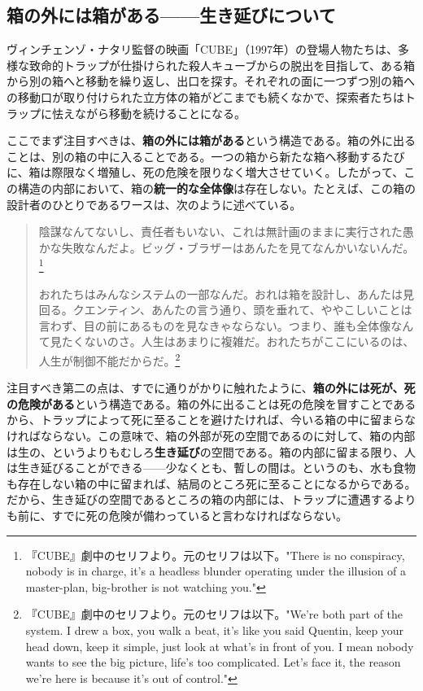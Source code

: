 \documentclass[a4paper]{jsarticle}
\begin{document}
\subsection{箱の外には箱がある------生き延びについて}

ヴィンチェンゾ・ナタリ監督の映画「CUBE」（1997年）の登場人物たちは、多様な致命的トラップが仕掛けられた殺人キューブからの脱出を目指して、ある箱から別の箱へと移動を繰り返し、出口を探す。それぞれの面に一つずつ別の箱への移動口が取り付けられた立方体の箱がどこまでも続くなかで、探索者たちはトラップに怯えながら移動を続けることになる。

ここでまず注目すべきは、\textbf{箱の外には箱がある}という構造である。箱の外に出ることは、別の箱の中に入ることである。一つの箱から新たな箱へ移動するたびに、箱は際限なく増殖し、死の危険を限りなく増大させていく。したがって、この構造の内部において、箱の\textbf{統一的な全体像}は存在しない。たとえば、この箱の設計者のひとりであるワースは、次のように述べている。

\begin{quotation}
陰謀なんてないし、責任者もいない、これは無計画のままに実行された愚かな失敗なんだよ。ビッグ・ブラザーはあんたを見てなんかいないんだ。\footnote{『CUBE』劇中のセリフより。元のセリフは以下。"There is no conspiracy, nobody is in charge, it's a headless blunder operating under the illusion of a master-plan, big-brother is not watching you."}

おれたちはみんなシステムの一部なんだ。おれは箱を設計し、あんたは見回る。クエンティン、あんたの言う通り、頭を垂れて、ややこしいことは言わず、目の前にあるものを見なきゃならない。つまり、誰も全体像なんて見たくないのさ。人生はあまりに複雑だ。おれたちがここにいるのは、人生が制御不能だからだ。\footnote{『CUBE』劇中のセリフより。元のセリフは以下。"We're both part of the system. I drew a box, you walk a beat, it's like you said Quentin, keep your head down, keep it simple, just look at what's in front of you. I mean nobody wants to see the big picture, life's too complicated. Let's face it, the reason we're here is because it's out of control."}
\end{quotation}

注目すべき第二の点は、すでに通りがかりに触れたように、\textbf{箱の外には死が、死の危険がある}という構造である。箱の外に出ることは死の危険を冒すことであるから、トラップによって死に至ることを避けたければ、今いる箱の中に留まらなければならない。この意味で、箱の外部が死の空間であるのに対して、箱の内部は生の、というよりもむしろ\textbf{生き延び}の空間である。箱の内部に留まる限り、人は生き延びることができる------少なくとも、暫しの間は。というのも、水も食物も存在しない箱の中に留まれば、結局のところ死に至ることになるからである。だから、生き延びの空間であるところの箱の内部には、トラップに遭遇するよりも前に、すでに死の危険が備わっていると言わなければならない。
\end{document}
